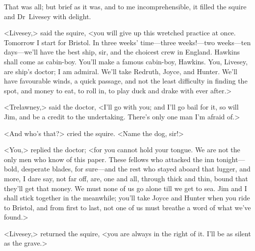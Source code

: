 That was all; but brief as it was, and to me incomprehensible, it filled the squire and Dr~Livesey with delight.

<Livesey,> said the squire, <you will give up this wretched practice at once. Tomorrow I start for Bristol. In three weeks' time—three weeks!—two weeks—ten days—we'll have the best ship, sir, and the choicest crew in England. Hawkins shall come as cabin-boy. You'll make a famous cabin-boy, Hawkins. You, Livesey, are ship's doctor; I am admiral. We'll take Redruth, Joyce, and Hunter. We'll have favourable winds, a quick passage, and not the least difficulty in finding the spot, and money to eat, to roll in, to play duck and drake with ever after.>

<Trelawney,> said the doctor, <I'll go with you; and I'll go bail for it, so will Jim, and be a credit to the undertaking. There's only one man I'm afraid of.>

<And who's that?> cried the squire. <Name the dog, sir!>

<You,> replied the doctor; <for you cannot hold your tongue. We are not the only men who know of this paper. These fellows who attacked the inn tonight—bold, desperate blades, for sure—and the rest who stayed aboard that lugger, and more, I dare say, not far off, are, one and all, through thick and thin, bound that they'll get that money. We must none of us go alone till we get to sea. Jim and I shall stick together in the meanwhile; you'll take Joyce and Hunter when you ride to Bristol, and from first to last, not one of us must breathe a word of what we've found.>

<Livesey,> returned the squire, <you are always in the right of it. I'll be as silent as the grave.>

